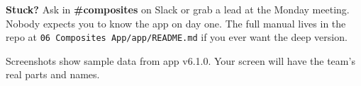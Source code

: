 \documentclass[11pt]{article}
\begin{document}
\vspace{14pt}


\vspace{8pt}
\textbf{Stuck?} Ask in \textbf{\#composites} on Slack or grab a lead at the
Monday meeting. Nobody expects you to know the app on day one. The full manual
lives in the repo at \texttt{06 Composites App/app/README.md} if you ever
want the deep version.

\vfill
{\small\color{muted}Screenshots show sample data from app v6.1.0. Your screen
will have the team's real parts and names.}
\end{document}
